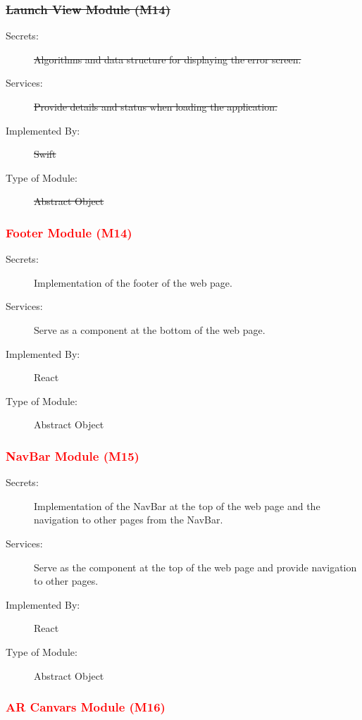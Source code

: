 \documentclass[12pt, titlepage]{article}
\begin{document}
\subsubsection{\sout{Launch View Module (M14)}}

\begin{description}
\item[Secrets:] \sout{Algorithms and data structure for displaying the error screen.}
\item[Services:] \sout{Provide details and status when loading the application.}
\item[Implemented By:] \sout{Swift}
\item[Type of Module:] \sout{Abstract Object}
\end{description}

\color{red}
\subsubsection{\textcolor{red}{Footer Module (M14)}}

\begin{description}
\item[Secrets:] Implementation of the footer of the web page. 
\item[Services:] Serve as a component at the bottom of the web page.
\item[Implemented By:] React
\item[Type of Module:] Abstract Object
\end{description}

\subsubsection{\textcolor{red}{NavBar Module (M15)}}

\begin{description}
\item[Secrets:] Implementation of the NavBar at the top of the web page and the navigation to other pages from the NavBar. 
\item[Services:] Serve as the component at the top of the web page and provide navigation to other pages.
\item[Implemented By:] React
\item[Type of Module:] Abstract Object
\end{description}

\subsubsection{\textcolor{red}{AR Canvars Module (M16)}}
\end{document}
